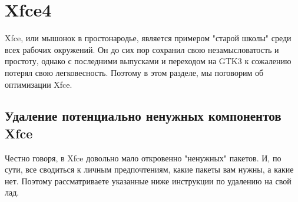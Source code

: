 \documentclass[letterpaper,10pt,russian,openany]{sphinxmanual}
\begin{document}
\section{Xfce4}
\label{\detokenize{source/de-optimizations:xfce4}}\label{\detokenize{source/de-optimizations:xfce-optimization}}\label{\detokenize{source/de-optimizations:index-17}}
\sphinxAtStartPar
Xfce, или мышонок в простонародье, является примером "старой школы" среди всех рабочих окружений.
Он до сих пор сохранил свою незамысловатость и простоту, однако с последними выпусками и переходом на GTK3 к сожалению потерял свою легковесность.
Поэтому в этом разделе, мы поговорим об оптимизации Xfce.

\ignorespaces 

\subsection{Удаление потенциально ненужных компонентов Xfce}
\label{\detokenize{source/de-optimizations:xfce}}\label{\detokenize{source/de-optimizations:xfce-garbage-removal}}\label{\detokenize{source/de-optimizations:index-18}}
\sphinxAtStartPar
Честно говоря, в Xfce довольно мало откровенно "ненужных" пакетов. И, по сути, все сводиться к личным предпочтениям, какие пакеты вам нужны, а какие нет.
Поэтому рассматриваете указанные ниже инструкции по удалению на свой лад.
\end{document}

